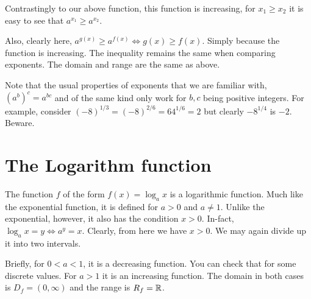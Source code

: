  Contrastingly to our above function, this function is increasing, for \(x_1 \ge x_2\) it is easy
 to see that \(a^{x_1} \ge a^{x_2}\). 

 \begin{figure}
    [H]
    \centering
 \end{figure}

 Also, clearly here, \(a^{g(x)} \ge a^{f(x)} \iff g(x) \ge f(x)\). Simply because the function is 
increasing. The inequality remains the same when comparing exponents. The domain and range
are the same as above. 

\begin{remark}
    Note that the usual properties of exponents that we are familiar with, \((a^{b})^{c} = a^{bc}\)
    and of the same kind only work for \(b, c\) being positive integers. For example, consider
    \((-8)^{1/3} = (-8)^{2/6} = 64^{1/6} = 2\) but clearly \(-8^{1/4}\) is \(-2\). Beware.
\end{remark}

\section{The Logarithm function}

The function \(f\) of the form \(f(x) = \log_{a} x\) is a logarithmic function. Much like 
the exponential function, it is defined for \(a > 0\) and \(a \ne 1\). Unlike the exponential, 
however, it also has the condition \(x > 0\). In-fact, \(\log_{a} x = y \iff a^y = x\). Clearly,
from here we have \(x > 0\). We may again divide up it into two intervals.

Briefly, for \(0 < a < 1\), it is a decreasing function. You can check that for 
some discrete values. For \(a > 1\) it is an increasing function. The domain in
both cases is \(D_f = (0, \infty)\) and the range is \(R_f = \mathbb R\). 

